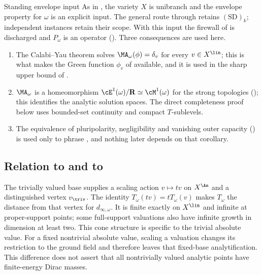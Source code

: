 \begin{important}{Standing envelope input}
\label{imp:ch49-envelope}
As in ,
the variety $X$ is unibranch and the envelope property for $\omega$ is
an explicit input. The general route through 
retains $\mathrm{(SD)}_k$; independent instances retain their scope.
With this input the firewall of  is
discharged and $P_\omega$ is an operator
().  Three consequences are used here.
\begin{enumerate}
\item\label{itm:ch49-env:cy}
      The Calabi--Yau theorem  solves
      $\MA_\omega(\phi)=\delta_v$ for every $v\in X^{\lin}$; this is
      what makes the Green function $\phi_v$ of
       available, and it is used in the sharp
      upper bound of .
\item\label{itm:ch49-env:homeo}
      $\MA_\omega$ is a homeomorphism
      $\cE^1(\omega)/\mathbf R\simeq\cM^1(\omega)$ for the strong
      topologies (); this identifies the analytic solution spaces.  The direct completeness
      proof below uses bounded-set continuity and compact $T$-sublevels.
\item\label{itm:ch49-env:polar}
      The equivalence of pluripolarity, negligibility and vanishing outer
      capacity () is used only to phrase
      , and nothing later depends on that
      corollary.
\end{enumerate}
\end{important}

\subsection{Relation to \texorpdfstring{}{Part III} and to
\texorpdfstring{}{Chapter 8}}
\label{sec:ch49-part3}

The trivially valued base supplies a scaling action
$v\mapsto tv$ on $X^{\An}$ and a distinguished vertex $v_{\triv}$.
The identity $T_\omega(tv)=tT_\omega(v)$ makes $T_\omega$ the distance
from that vertex for $d_{\infty,\omega}$.  It is finite exactly on
$X^{\lin}$ and infinite at proper-support points; some full-support
valuations also have infinite growth in dimension at least two.
This cone structure is specific to the trivial absolute value.
For a fixed nontrivial absolute value, scaling a valuation changes its
restriction to the ground field and therefore leaves that fixed-base
analytification.  This difference does not assert that all nontrivially
valued analytic points have finite-energy Dirac masses.

